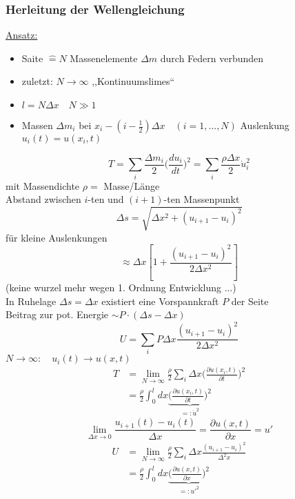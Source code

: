 \documentclass[titlepage,12pt,a4paper,ngerman]{report}
\newcommand{\ub}[1]{\underbrace{#1}}
\begin{document}
\subsubsection{Herleitung der Wellengleichung}
\underline{Ansatz:}
\begin{itemize}
	\item Saite $ \widehat{=} N $ Massenelemente $ \Delta m $ durch Federn verbunden
	\item zuletzt: $ N \rightarrow \infty $ ,,Kontinuumslimes``
	\item $ l= N \Delta x \quad N \gg 1 $
	\item Massen $ \Delta m_i $ bei $ x_i - (i-\frac{1}{2}) \Delta x \quad (i=1,\dots, N) $ Auslenkung $ u_i(t) = u(x_i,t) $ 
\end{itemize}
\begin{equation*}
T = \sum_{i} \frac{\Delta m_i}{2} \bigg( \frac{du_i}{dt} \bigg) ^2 = \sum_i \frac{\rho \Delta x}{2} \dot{u}_i^2 \tag{1}
\end{equation*}
mit Massendichte $ \rho = $ Masse/Länge \\
Abstand zwischen $ i $-ten und $ (i+1) $-ten Massenpunkt
$$\Delta s = \sqrt{\Delta x^2 + (u_{i+1} - u_i)^2} $$
für kleine Auslenkungen
$$ \approx \Delta x [1 + \frac{(u_{i+1} - u_i)^2}{2 \Delta x^2}]$$
(keine wurzel mehr wegen 1. Ordnung Entwicklung ...)\\
In Ruhelage $ \Delta s = \Delta x $ existiert eine Vorspannkraft $ P $ der Seite\\
Beitrag zur pot. Energie $ \sim P \cdot (\Delta s - \Delta x) $
\begin{equation*}
U = \sum_i P \Delta x \frac{(u_{i+1} - u_i)^2}{2 \Delta x^2} \tag{2}
\end{equation*}
$ N \rightarrow \infty : \quad u_i(t) \rightarrow u(x,t) $
\begin{align*}
T &= \lim\limits_{N\rightarrow \infty} \frac{\rho}{2} \sum_i \Delta x \bigg( \frac{\partial u(x_i,t)}{\partial t} \bigg) ^2\\
&= \frac{\rho}{2} \int_{0}^{l} dx \ub{\bigg( \frac{\partial u(x_i,t)}{\partial t} \bigg) ^2}_{=: \dot{u}^2}
\end{align*}
$$ \lim_{\Delta x \to 0} \frac{u_{i+1}(t) - u_i(t)}{\Delta x} = \frac{\partial u(x,t)}{\partial x} = u'$$
\begin{align*}
U &= \lim\limits_{N\rightarrow \infty} \frac{\rho}{2} \sum_i \Delta x \frac{(u_{i+1} - u_i)^2}{\Delta^2 x}\\
&= \frac{\rho}{2} \int_{0}^{l} dx \ub{\bigg( \frac{\partial u(x,t)}{\partial x} \bigg) ^2}_{=: u'^2}
\end{align*}
\end{document}
